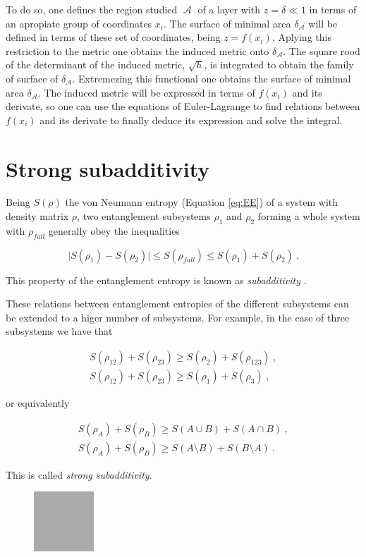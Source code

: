 \documentclass[lettersize,journal]{IEEEtran}
\providecommand{\abs}[1]{\lvert#1\rvert}
\providecommand{\eq}[2]{
    \begin{equation}
        #2
    \label{eq:#1}
    \end{equation}
}
\DeclareMathOperator{\calA}{\mathcal{A}}
\begin{document}
To do so, one defines the region studied $\calA$ of a layer with $z = \delta \ll 1$ in terms of an apropiate group of coordinates $x_i$. The surface of minimal area $\delta_{\calA}$ will be defined in terms of these set of coordinates, being $z = f (x_i)$. Aplying this restriction to the metric one obtains the induced metric onto $\delta_{\calA}$. The square rood of the determinant of the induced metric, $\sqrt{h}$, is integrated to obtain the family of surface of $\delta_{\calA}$. Extremezing this functional one obtains the surface of minimal area $\delta_{\calA}$. The induced metric will be expressed in terms of $f(x_i)$ and its derivate, so one can use the equations of Euler-Lagrange to find relations between $f (x_i)$ and its derivate to finally deduce its expression and solve the integral.


\section{Strong subadditivity} \label{s:SS}

Being $S(\rho)$ the von Neumann entropy (Equation \ref{eq:EE}) of a system with density matrix $\rho$, two entanglement subsystems $\rho_1$ and $\rho_2$ forming a whole system with $\rho_{full}$ generally obey the inequalities
\eq{EE_subadd}{
    \abs{S(\rho_1)-S(\rho_2)} \le S(\rho_{full}) \le S(\rho_1) + S(\rho_2) \ .
}
This property of the entanglement entropy is known as \textit{subadditivity} \cite{headrick_holographic_2007}.

These relations between entanglement entropies of the different subsystems can be extended to a higer number of subsystems. For example, in the case of three subsystems we have that
\eq{EE_strong-subadd}{
    \begin{array}{c}
        S(\rho_{12}) + S(\rho_{23}) \ge S(\rho_2) + S(\rho_{123}) \ , \\
        S(\rho_{12}) + S(\rho_{23}) \ge S(\rho_1) + S(\rho_3) \ ,
    \end{array}
}
or equivalently
\eq{EE_strong-subadd-2}{
    \begin{array}{c}
        S(\rho_{A}) + S(\rho_{B}) \ge S(A \cup B) + S(A \cap B) \ , \\
        S(\rho_{A}) + S(\rho_{B}) \ge S(A \setminus B) + S(B \setminus A) \ .
    \end{array}
}
This is called \textit{strong subadditivity}.

\begin{figure}
    \centering
    \includegraphics[width=0.2\textwidth]{../Imatges/empty.png}
\caption{}
\label{fig:}
\end{figure}
\end{document}
